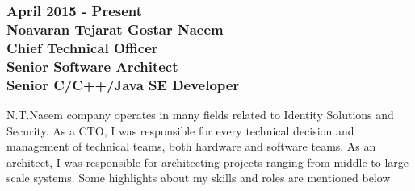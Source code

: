 \documentclass[10pt,a4paper]{article}
\begin{document}
\subsubsection{\textnormal {April 2015 - Present} \\ \textnormal {Noavaran Tejarat Gostar Naeem} \\ Chief Technical Officer \\ Senior Software Architect \\ Senior C/C++/Java SE Developer}
  \setlength{\leftskip}{0.5cm}
  \setlength{\rightskip}{1cm}
  N.T.Naeem company operates in many fields related to Identity Solutions and Security. As a CTO, I was responsible for every technical decision and management of technical teams, both hardware and software teams. As an architect, I was responsible for architecting projects ranging from middle to large scale systems. Some highlights about my skills and roles are mentioned below.
\end{document}
